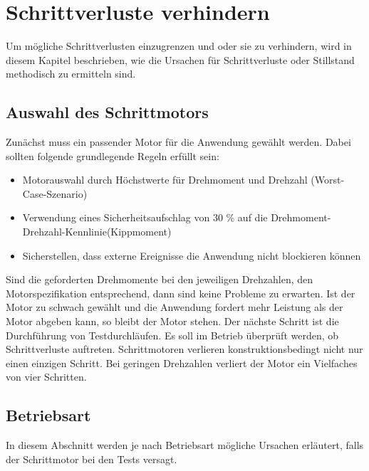%
%
\chapter{Schrittverluste verhindern}
Um mögliche Schrittverlusten einzugrenzen und oder sie zu verhindern, wird in diesem Kapitel beschrieben, wie die Ursachen für Schrittverluste oder Stillstand methodisch zu ermitteln sind. \cite{FaulhaberDriveSystems.2020}

\section{Auswahl des Schrittmotors}
Zunächst muss ein passender Motor für die Anwendung gewählt werden. Dabei sollten folgende grundlegende Regeln erfüllt sein:
\begin{itemize}
	\item Motorauswahl durch Höchstwerte für Drehmoment und Drehzahl (Worst-Case-Szenario)
	\item Verwendung eines Sicherheitsaufschlag von 30 \% auf die Drehmoment-Drehzahl-Kennlinie(Kippmoment)
	\item Sicherstellen, dass externe Ereignisse die Anwendung nicht blockieren können
\end{itemize}

Sind die geforderten Drehmomente bei den jeweiligen Drehzahlen, den Motorspezifikation entsprechend, dann sind keine Probleme zu erwarten. Ist der Motor zu schwach gewählt und die Anwendung fordert mehr Leistung als der Motor abgeben kann, so bleibt der Motor stehen. Der nächste Schritt ist die Durchführung von Testdurchläufen. Es soll im Betrieb überprüft werden, ob Schrittverluste auftreten. Schrittmotoren verlieren konstruktionsbedingt nicht nur einen einzigen Schritt. Bei geringen Drehzahlen verliert der Motor ein Vielfaches von vier Schritten.\cite{FaulhaberDriveSystems.2020}

\section{Betriebsart}

In diesem Abschnitt werden je nach Betriebsart mögliche Ursachen erläutert, falls der Schrittmotor bei den Tests versagt.

